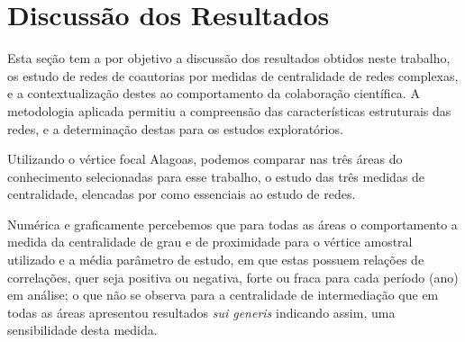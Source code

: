 \section{\textbf{Discussão dos Resultados}}

Esta seção tem a por objetivo a discussão dos resultados obtidos neste trabalho, os estudo de redes de coautorias por medidas de centralidade de redes complexas, e a contextualização destes ao comportamento da colaboração científica. A metodologia aplicada permitiu a compreensão das características estruturais das redes, e a determinação destas para os estudos exploratórios.

Utilizando o vértice focal Alagoas, podemos comparar nas três áreas do conhecimento selecionadas para esse trabalho, o estudo das três medidas de centralidade, elencadas por \citet{freeman1991centrality} como essenciais ao estudo de redes.

Numérica e graficamente percebemos que para todas as áreas o comportamento a medida da centralidade de grau e de proximidade para o vértice amostral utilizado e a média parâmetro de estudo, em que estas possuem relações de correlações, quer seja positiva ou negativa, forte ou fraca para cada período (ano) em análise; o que não se observa para a centralidade de intermediação que em todas as áreas apresentou resultados \textit{sui generis} indicando assim, uma sensibilidade desta medida.


	
	
	
